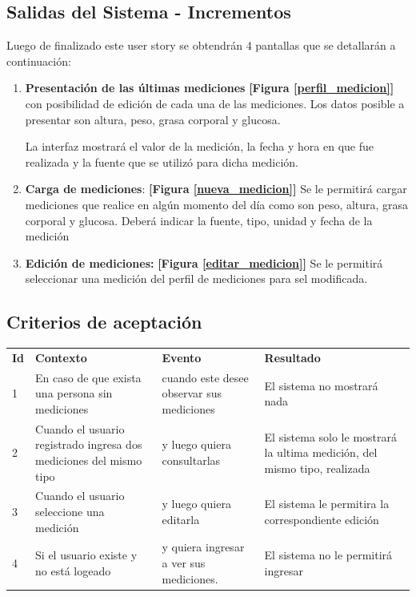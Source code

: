 \documentclass[a4paper,12pt]{article}
\begin{document}
\subsection {Salidas del Sistema - Incrementos}

Luego de finalizado este user story se obtendrán 4 pantallas que se detallarán a continuación:
\begin{enumerate}
    \item \textbf{Presentación de las últimas mediciones}  \textbf{[Figura  \ref{perfil_medicion}]} con posibilidad de edición de cada una de las mediciones. Los datos posible  a presentar son altura, peso, grasa corporal y glucosa. 
    
    La interfaz mostrará el valor de la medición, la fecha y hora en que fue realizada y la fuente que se utilizó para dicha medición.
	\item \textbf{Carga de mediciones}: \textbf{[Figura \ref{nueva_medicion}]} Se le permitirá cargar mediciones que realice en algún momento del día como son peso, altura, grasa corporal y glucosa. Deberá indicar la fuente, tipo, unidad y fecha de la medición
    \item \textbf{Edición de mediciones:}  \textbf{[Figura \ref{editar_medicion}]} Se le permitirá seleccionar una medición del perfil de mediciones para sel modificada.

\end{enumerate}

    




\subsection{Criterios de aceptación}

\begin{center}
\begin{longtable}{|p{0.5cm}|p{4cm}|p{4cm}|p{5cm}|}
\hline \hline \rowcolor[gray]{0.9}
	\multicolumn{4}{||c|}{\textbf{Criterio de aceptación}} \\
    \hline  \rowcolor[gray]{0.9}
        \textbf{Id} &
        \textbf{Contexto} &
        \textbf{Evento}&
        \textbf{Resultado} \\
    \hline
1&En caso de que exista una persona sin mediciones & cuando este desee observar sus mediciones  & El sistema no mostrará nada \\ \hline
 
2& Cuando el usuario registrado ingresa dos mediciones del mismo tipo  & y luego quiera consultarlas & El sistema solo le mostrará la ultima medición, del mismo tipo, realizada\\ \hline

3& Cuando el usuario seleccione una medición & y luego quiera editarla & El sistema le permitira la correspondiente edición\\ \hline

4& Si el usuario existe y no está logeado & y quiera ingresar a ver sus mediciones. & El sistema no le permitirá ingresar\\ \hline
  \end{longtable}
\end{center}
\end{document}
